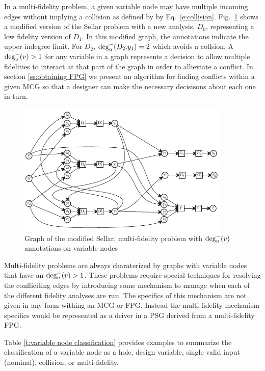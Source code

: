   In a multi-fidelity problem, a given variable node may have multiple incoming 
  edges without implying a collision as defined by by Eq.~\ref{e:collision}. 
  Fig.~\ref{f:collision_example} shows a modified version of the Sellar problem 
  with a new analysis, $D_0$, representing a low fidelity version of $D_1$. 
  In this modified graph, the annotations indicate the upper indegree limit. For 
  $D_2$, $\textrm{deg}^-_u(D_2.y_1) = 2$ which avoids a collsion. A  
  $\textrm{deg}^-_u(v) > 1$ for any variable in a graph represents a decision to 
  allow multiple fidelities to interact at that part of the graph in order to allieviate
  a conflict. In section \ref{ss:obtaining FPG} we present an algorithm for finding 
  conflicts within a given MCG so that a designer can make the necessary decisisons about each 
  one in turn. 
  \begin{figure}
    \begin{center}
      \includegraphics[width=4in]{images/sellar_mulfi}
    \caption{Graph of the modified Sellar, multi-fidelity problem with $\textrm{deg}^-_u(v)$ annotations on variable nodes\label{f:collision_example}}
  \end{center}
  \end{figure}

  Multi-fidelity problems are always charaterized by graphs with variable 
  nodes that have an $\textrm{deg}^-_u(v) > 1$. These problems require 
  special techniques for resolving the confliciting edges by introducing some mechanism
  to manage when each of the different fidelity analyses are 
  run\cite{march2012provably,alexandrov2001approximation,Huang_Allen_Notz_Miller_2006}.
  The specifics of this mechanism are not given in any form withing an MCG or 
  FPG. Instead the multi-fidelity mechanism specifics would be represented as a 
  driver in a PSG derived from a multi-fidelity FPG. 

Table \ref{t:variable node classification} provides examples to summarize the classification of a variable node as a hole, design variable, single valid input (nominal), collision, or multi-fidelity.

